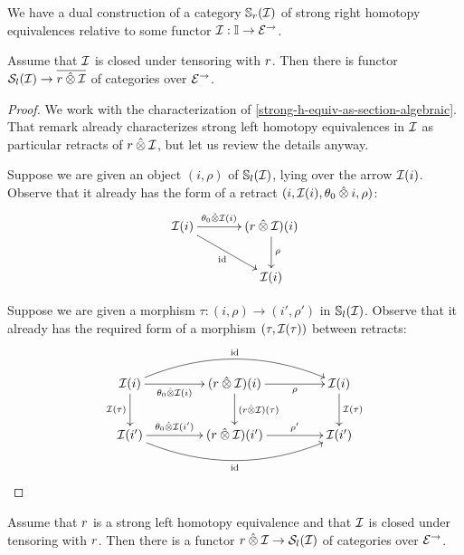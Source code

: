 \documentclass[reqno,10pt,a4paper,oneside]{amsart}
\begin{document}
\begin{remark}
We have a dual construction of a category $\cat{S}_r(\cal{I})$ of strong right homotopy equivalences relative to some functor $\cal{I} : \cat{I} \to \catE^{\to}$.
\end{remark}

\begin{lemma}
\label{she-to-retract-closure}
Assume that $\cal{I}$ is closed under tensoring with $\intervalr$.
Then there is functor $\cal{S}_l(\cal{I}) \to \overline{\intervalr \hatotimes \cal{I}}$ of categories over $\catE^{\to}$.
\end{lemma}

\begin{proof}
We work with the characterization of \cref{strong-h-equiv-as-section-algebraic}.
That remark already characterizes strong left homotopy equivalences in $\cal{I}$ as particular retracts of $\intervalr \hatotimes \cal{I}$, but let us review the details anyway.

Suppose we are given an object $(i, \rho)$ of $\cat{S}_l(\cal{I})$, lying over the arrow $\cal{I}(i)$.
Observe that it already has the form of a retract $(i, \cal{I}(i), \thetal \hatotimes i, \rho)$:
\[
\xymatrix@C+1em{
  \cal{I}(i)
  \ar[r]^-{\thetal \hatotimes \cal{I}(i)}
  \ar[dr]_{\id}
&
  (\intervalr \hatotimes \cal{I})(i) \ar[d]^{\rho}
\\&
  \cal{I}(i)
}
\]

Suppose we are given a morphism $\tau : (i, \rho) \to (i', \rho')$ in $\cat{S}_l(\cal{I})$.
Observe that it already has the required form of a morphism $(\tau, \cal{I}(\tau))$ between retracts:
\[
\xymatrix@C+2em{
  \cal{I}(i)
  \ar[r]_-{\thetal \hatotimes \cal{I}(i)}
  \ar[d]_{\cal{I}(\tau)}
  \ar@/^2em/[rr]^{\id}
&
  (\intervalr \hatotimes \cal{I})(i)
  \ar[r]_-{\rho}
  \ar[d]^{(\intervalr \hatotimes \cal{I})(\tau)}
&
  \cal{I}(i)
  \ar[d]^{\cal{I}(\tau)}
\\
  \cal{I}(i')
  \ar[r]^-{\thetal \hatotimes \cal{I}(i')}
  \ar@/_2em/[rr]_{\id}
&
  (\intervalr \hatotimes \cal{I})(i')
  \ar[r]^-{\rho'}
&
  \cal{I}(i')
}
\]
\end{proof}

\begin{lemma}
\label{horn-times-gen-to-she}
Assume that $\intervalr$ is a strong left homotopy equivalence and that $\cal{I}$ is closed under tensoring with $\intervalr$.
Then there is a functor $\intervalr \hatotimes \cal{I} \to \cal{S}_l(\cal{I})$ of categories over $\catE^{\to}$.
\end{lemma}
\end{document}
